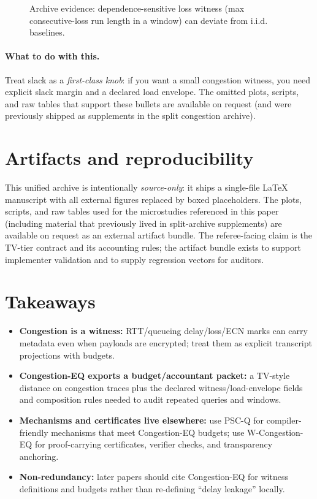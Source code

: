 \documentclass[11pt]{article}
\theoremstyle{definition}
\theoremstyle{remark}
\begin{document}
\begin{figure}[t]
\centering
{}
\caption{Archive evidence: dependence-sensitive loss witness (max consecutive-loss run length in a window) can deviate from i.i.d. baselines.}
\label{fig:mm1krun}
\end{figure}

\paragraph{What to do with this.}
Treat slack as a \emph{first-class knob}: if you want a small congestion witness, you need explicit slack margin and a declared load envelope.
The omitted plots, scripts, and raw tables that support these bullets are available on request (and were previously shipped as supplements in the split congestion archive).


\section{Artifacts and reproducibility}
This unified archive is intentionally \emph{source-only}: it ships a single-file \LaTeX{} manuscript with all external figures replaced by boxed placeholders.
The plots, scripts, and raw tables used for the microstudies referenced in this paper (including material that previously lived in split-archive supplements) are available on request as an external artifact bundle.
The referee-facing claim is the TV-tier contract and its accounting rules; the artifact bundle exists to support implementer validation and to supply regression vectors for auditors.

\section{Takeaways}
\begin{itemize}[leftmargin=*]
\item \textbf{Congestion is a witness:} RTT/queueing delay/loss/ECN marks can carry metadata even when payloads are encrypted; treat them as explicit transcript projections with budgets.
\item \textbf{Congestion-EQ exports a budget/accountant packet:} a TV-style distance on congestion traces plus the declared witness/load-envelope fields and composition rules needed to audit repeated queries and windows.
\item \textbf{Mechanisms and certificates live elsewhere:} use PSC-Q for compiler-friendly mechanisms that meet Congestion-EQ budgets; use W-Congestion-EQ for proof-carrying certificates, verifier checks, and transparency anchoring.
\item \textbf{Non-redundancy:} later papers should cite Congestion-EQ for witness definitions and budgets rather than re-defining ``delay leakage'' locally.
\end{itemize}
\end{document}
